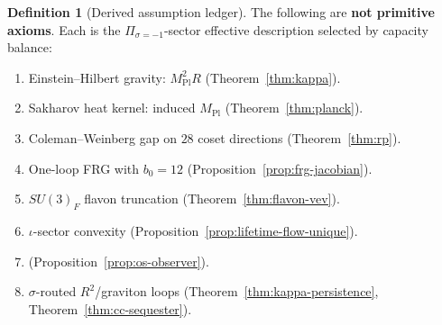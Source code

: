 \documentclass[aps,prd,onecolumn,amsmath,amssymb,nofootinbib,11pt]{revtex4-2}
\numberwithin{equation}{section}
\theoremstyle{plain}
\theoremstyle{definition}
\newtheorem{definition}[theorem]{Definition}
\theoremstyle{remark}
\newcommand{\MPl}{M_{\mathrm{Pl}}}
\begin{document}
\begin{definition}[Derived assumption ledger]\label{def:assumption-ledger}
The following are \textbf{not primitive axioms}. Each is the
$\Pi_{\sigma=-1}$-sector effective description selected by capacity balance:
\begin{enumerate}[label=\textbf{A\arabic*},leftmargin=*]
  \item \label{asm:eh} Einstein--Hilbert gravity: $\MPl^2 R$
    (Theorem~\ref{thm:kappa}).
  \item \label{asm:sakharov} Sakharov heat kernel: induced $\MPl$
    (Theorem~\ref{thm:planck}).
  \item \label{asm:cw} Coleman--Weinberg gap on $28$ coset directions
    (Theorem~\ref{thm:rp}).
  \item \label{asm:frg} One-loop FRG with $b_0=12$
    (Proposition~\ref{prop:frg-jacobian}).
  \item \label{asm:flavon} $SU(3)_F$ flavon truncation
    (Theorem~\ref{thm:flavon-vev}).
  \item \label{asm:convex} $\iota$-sector convexity
    (Proposition~\ref{prop:lifetime-flow-unique}).
  \item \label{asm:os}%
    (Proposition~\ref{prop:os-observer}).
  \item \label{asm:grav-loops} $\sigma$-routed $R^2$/graviton loops
    (Theorem~\ref{thm:kappa-persistence}, Theorem~\ref{thm:cc-sequester}).
\end{enumerate}
\end{definition}
\end{document}
